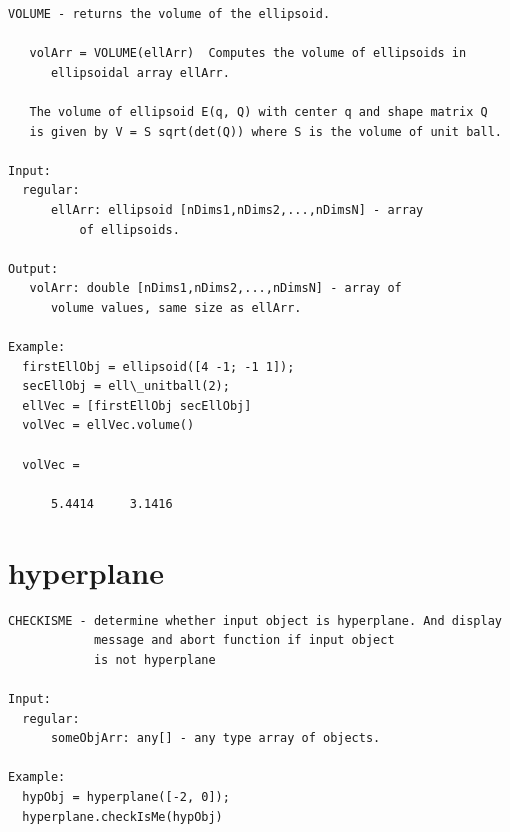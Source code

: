 \documentclass[letterpaper,10pt,english]{sphinxmanual}
\begin{document}
\begin{Verbatim}[commandchars=\\\{\}]
VOLUME - returns the volume of the ellipsoid.

   volArr = VOLUME(ellArr)  Computes the volume of ellipsoids in
      ellipsoidal array ellArr.

   The volume of ellipsoid E(q, Q) with center q and shape matrix Q
   is given by V = S sqrt(det(Q)) where S is the volume of unit ball.

Input:
  regular:
      ellArr: ellipsoid [nDims1,nDims2,...,nDimsN] - array
          of ellipsoids.

Output:
   volArr: double [nDims1,nDims2,...,nDimsN] - array of
      volume values, same size as ellArr.

Example:
  firstEllObj = ellipsoid([4 -1; -1 1]);
  secEllObj = ell\_unitball(2);
  ellVec = [firstEllObj secEllObj]
  volVec = ellVec.volume()

  volVec =

      5.4414     3.1416
\end{Verbatim}


\section{hyperplane}
\label{chap_func:hyperplane}
\begin{Verbatim}[commandchars=\\\{\}]
CHECKISME - determine whether input object is hyperplane. And display
            message and abort function if input object
            is not hyperplane

Input:
  regular:
      someObjArr: any[] - any type array of objects.

Example:
  hypObj = hyperplane([-2, 0]);
  hyperplane.checkIsMe(hypObj)
\end{Verbatim}
\end{document}
